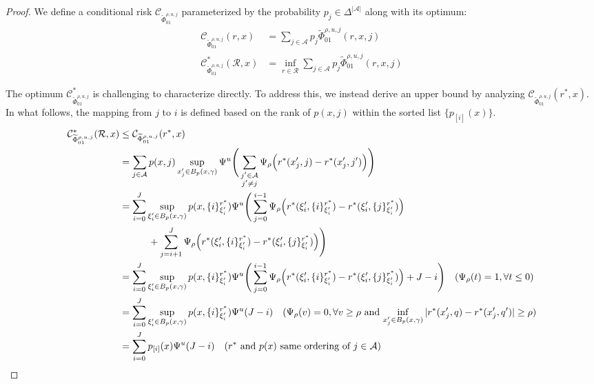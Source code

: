\begin{appendices}
\begin{proof}

We define a conditional risk $\mathcal{C}_{\widetilde{\Phi}_{01}^{\rho,u,j}}$  parameterized by the probability \( p_j \in \Delta^{|\mathcal{A}|} \) along with its optimum:
\begin{equation}
\begin{aligned}
    \mathcal{C}_{\widetilde{\Phi}_{01}^{\rho,u,j}}(r, x) & = \sum_{j \in \mathcal{A}} p_j \widetilde{\Phi}_{01}^{\rho,u,j}(r, x, j) \\
    \mathcal{C}^\ast_{\widetilde{\Phi}_{01}^{\rho,u,j}}(\mathcal{R}, x) & = \inf_{r \in \mathcal{R}} \sum_{j \in \mathcal{A}} p_j \widetilde{\Phi}_{01}^{\rho,u,j}(r, x, j)
\end{aligned}
\end{equation}

The optimum \( \mathcal{C}^\ast_{\widetilde{\Phi}_{01}^{\rho,u,j}} \) is challenging to characterize directly. To address this, we instead derive an upper bound by analyzing \( \mathcal{C}_{\widetilde{\Phi}_{01}^{\rho,u,j}}(r^\ast, x) \). In what follows, the mapping from \( j \) to \( i \) is defined based on the rank of \( p(x, j) \) within the sorted list \( \{p_{[i]}(x)\} \).
\begin{equation}
    \begin{aligned}
        \mathcal{C}^\ast_{\widetilde{\Phi}_{01}^{\rho,u,j}}(\mathcal{R}, x) & \leq  \mathcal{C}_{\widetilde{\Phi}_{01}^{\rho,u,j}}(r^\ast, x) \\
     &= \sum_{j \in \mathcal{A}} p(x, j) \sup_{x'_j \in B_p(x, \gamma)} \Psi^u \Bigg( \sum_{\substack{j' \in \mathcal{A} \\ j' \neq j}} \Psi_\rho\Big( r^*(x'_j, j) - r^*(x'_j, j') \Big)\Bigg) \\
     & = \sum_{i=0}^J \sup_{\xi_i' \in B_p(x,\gamma)} p(x,\{i\}_{\xi_i'}^{r^\ast}) \Psi^u \Bigg(\sum_{j=0}^{i-1} \Psi_\rho \Big(r^\ast(\xi_i', \{i\}^{r^\ast}_{\xi_i'}) - r^\ast(\xi'_i, \{j\}^{r^\ast}_{\xi_i'})\Big)  \\
     & \quad \quad \quad + \sum_{j=i+1}^{J} \Psi_\rho \Big(r^\ast(\xi_i', \{i\}^{r^\ast}_{\xi_i'}) - r^\ast(\xi'_i, \{j\}^{r^\ast}_{\xi_i'})\Big) \Bigg)  \\
     & = \sum_{i=0}^J \sup_{\xi_i' \in B_p(x,\gamma)} p(x,\{i\}_{\xi_i'}^{r^\ast}) \Psi^u \Bigg(\sum_{j=0}^{i-1} \Psi_\rho \Big(r^\ast(\xi_i', \{i\}^{r^\ast}_{\xi_i'}) - r^\ast(\xi'_i, \{j\}^{r^\ast}_{\xi_i'})\Big) + J-i\Bigg) \quad \text{($\Psi_\rho(t)=1,  \forall t\leq 0$)} \\
     & = \sum_{i=0}^J \sup_{\xi_i' \in B_p(x,\gamma)} p(x,\{i\}_{\xi_i'}^{r^\ast}) \Psi^u(J-i) \quad \text{($\Psi_\rho(v)=0, \forall v\geq \rho$ and $\inf_{x'_j \in B_p(x,\gamma)}|r^*(x'_j, q) - r^*(x'_j, q')| \geq \rho$)} \\
     & = \sum_{i=0}^J p_{[i]}(x)\Psi^u(J-i) \quad \text{($r^\ast$ and $p(x)$ same ordering of $j\in\mathcal{A}$)}
    \end{aligned}
\end{equation}


\end{proof}
\end{appendices}

